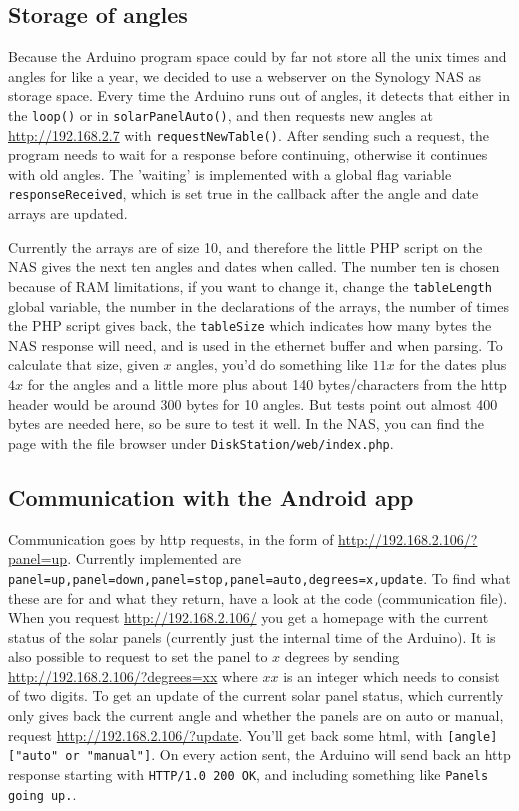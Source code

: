 		\subsection{Storage of angles}\label{subsec:storageOfAngles}
			Because the Arduino program space could by far not store all the unix times and angles for like a year, we decided to use a webserver on the Synology NAS as storage space.
			Every time the Arduino runs out of angles, it detects that either in the \verb|loop()| or in \verb|solarPanelAuto()|, and then requests new angles at \url{http://192.168.2.7} with \verb|requestNewTable()|. After sending such a request, the program needs to wait for a response before continuing, otherwise it continues with old angles.
			The 'waiting' is implemented with a global flag variable \verb|responseReceived|, which is set true in the callback after the angle and date arrays are updated.

			Currently the arrays are of size 10, and therefore the little PHP script on the NAS gives the next ten angles and dates when called.
			The number ten is chosen because of RAM limitations, if you want to change it, change the \verb|tableLength| global variable, the number in the declarations of the arrays, the number of times the PHP script gives back, the \verb|tableSize| which indicates how many bytes the NAS response will need, and is used in the ethernet buffer and when parsing.
			To calculate that size, given $x$ angles, you'd do something like $11x$ for the dates plus $4x$ for the angles and a little more plus about 140 bytes/characters from the http header would be around 300 bytes for 10 angles.
			But tests point out almost 400 bytes are needed here, so be sure to test it well.
			In the NAS, you can find the page with the file browser under \verb|DiskStation/web/index.php|.

		\subsection{Communication with the Android app} \label{subsec:arduinotoandroid}
			Communication goes by http requests, in the form of \url{http://192.168.2.106/?panel=up}.
			Currently implemented are \verb|panel=up,panel=down,panel=stop,panel=auto,degrees=x,update|.
			To find what these are for and what they return, have a look at the code (communication file).
			When you request \url{http://192.168.2.106/} you get a homepage with the current status of the solar panels (currently just the internal time of the Arduino).
			It is also possible to request to set the panel to $x$ degrees by sending \url{http://192.168.2.106/?degrees=xx} where $xx$ is an integer which needs to consist of two digits.
			To get an update of the current solar panel status, which currently only gives back the current angle and whether the panels are on auto or manual, request \url{http://192.168.2.106/?update}.
			You'll get back some html, with \verb|[angle] ["auto" or "manual"]|.
			On every action sent, the Arduino will send back an http response starting with \verb|HTTP/1.0 200 OK|, and including something like \verb|Panels going up.|.

